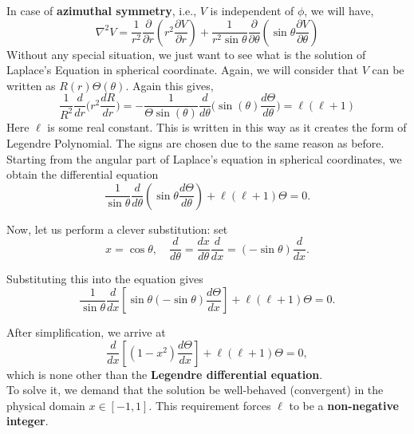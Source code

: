 \documentclass{article}
\begin{document}
In case of \textbf{azimuthal symmetry}, i.e., $V$ is independent of $\phi$, we will have,
\begin{equation}
    \nabla^2 V =
\frac{1}{r^2} \frac{\partial}{\partial r}
\left( r^2 \frac{\partial V}{\partial r} \right)
+ \frac{1}{r^2 \sin \theta} \frac{\partial}{\partial \theta}
\left( \sin \theta \frac{\partial V}{\partial \theta} \right)
\label{spherical_lap}
\end{equation}
Without any special situation, we just want to see what is the solution of Laplace's Equation in spherical coordinate. Again, we will consider that $V$ can be written as $R(r) \Theta(\theta)$. Again this gives,
\begin{equation}
    \frac{1}{R^2}\frac{d}{dr}\Big( r^2 \frac{dR}{dr} \Big) = - \frac{1}{\Theta \sin(\theta)}\frac{d}{d\theta}\Big( \sin(\theta) \frac{d\Theta}{d\theta} \Big)= \ell(\ell+1)
\end{equation}
Here $\ell$ is some real constant. This is written in this way as it creates the form of Legendre Polynomial. The signs are chosen due to the same reason as before.\\
Starting from the angular part of Laplace’s equation in spherical coordinates, 
we obtain the differential equation
\begin{equation*}
\frac{1}{\sin\theta}\frac{d}{d\theta}
\left( \sin\theta \frac{d\Theta}{d\theta} \right)
+ \ell(\ell+1)\Theta = 0.
\end{equation*}

Now, let us perform a clever substitution: set
\begin{equation*}
x = \cos\theta, 
\quad \frac{d}{d\theta} = \frac{dx}{d\theta}\frac{d}{dx} = (-\sin\theta)\frac{d}{dx}.
\end{equation*}

Substituting this into the equation gives
\begin{equation*}
\frac{1}{\sin\theta}
\frac{d}{dx}\left[ \sin\theta(-\sin\theta)\frac{d\Theta}{dx} \right]
+ \ell(\ell+1)\Theta = 0.
\end{equation*}

After simplification, we arrive at
\begin{equation*}
\frac{d}{dx}\!\left[ (1-x^2)\frac{d\Theta}{dx} \right]
+ \ell(\ell+1)\Theta = 0,
\end{equation*}
which is none other than the \textbf{Legendre differential equation}.\\

To solve it, we demand that the solution be well-behaved (convergent) 
in the physical domain $x \in [-1,1]$. 
This requirement forces $\ell$ to be a \textbf{non-negative integer}.
\end{document}
